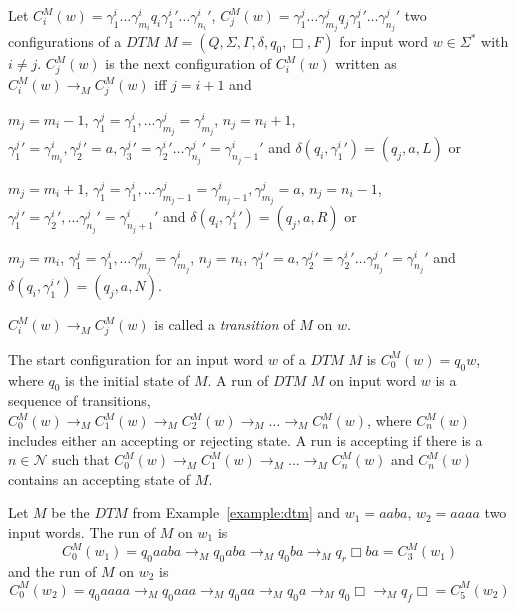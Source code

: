 \begin{definition}
    Let $C_i^M(w) = \gamma_1^i\dots\gamma_{m_i}^i{q_i}{\gamma_1^i}'\dots{\gamma_{n_i}^i}'$, $C_j^M(w) =
    \gamma_1^j\dots\gamma_{m_j}^j{q_j}{\gamma_1^j}'\dots{\gamma_{n_j}^j}'$ two configurations of a $\mathit{DTM}$ $M = (Q, \Sigma,
    \Gamma,
    \delta, q_0, \Box, F)$ for input word $w \in \Sigma^*$ with $i \neq j$. $C_j^M(w)$ is the next configuration
    of $C_i^M(w)$ written as $C_i^M(w) \rightarrow_M C_j^M(w)$ iff $j = i + 1$ and
    \begin{compactitem}
        \item $m_j = m_i - 1$, $\gamma_1^j = \gamma_1^i, \dots \gamma_{m_j}^j = \gamma_{m_j}^i$, $n_j = n_i + 1$,
        ${\gamma_1^j}' = \gamma_{m_i}^i, {\gamma_2^j}' = a, {\gamma_3^j}' = {\gamma_2^i}' \dots {\gamma_{n_j}^j}' =
        {\gamma_{{n_j}- 1}^i}'$ and $\delta(q_i, {\gamma_1^i}') = (q_j, a, L)$ or
        \item $m_j = m_i + 1$, $\gamma_1^j = \gamma_1^i, \dots \gamma_{m_j-1}^j = \gamma_{m_j-1}^i, \gamma_{m_j}^j
        = a$, $n_j = n_i - 1$, ${\gamma_1^j}' = {\gamma_2^i}', \dots {\gamma_{n_j}^j}' = {\gamma_{{n_j}+1}^i}'$ and
$\delta (q_i, {\gamma_1^i}') = (q_j, a, R)$ or
        \item $m_j = m_i$, $\gamma_1^j = \gamma_1^i, \dots \gamma_{m_j}^j = \gamma_{m_j}^i$, $n_j = n_i$, ${\gamma_1^j}'
= a, {\gamma_2^j}' = {\gamma_2^i}' \dots {\gamma_{n_j}^j}' = {\gamma_{n_j}^i}'$ and $\delta
        (q_i, {\gamma_1^i}') = (q_j, a, N)$.
    \end{compactitem}
    $C_i^M(w) \rightarrow_M C_j^M(w)$ is called a \emph{transition} of $M$ on $w$.
\end{definition}

The start configuration for an input word $w$ of a $\mathit{DTM}$ $M$ is $C_0^M(w) = q_0w$, where $q_0$ is the
initial state of $M$. A run of $\mathit{DTM}$ $M$ on input word $w$ is a sequence of transitions, $C_0^M(w)
\rightarrow_M C_1^M(w) \rightarrow_M C_2^M(w) \rightarrow_M \dots \rightarrow_M C_n^M(w)$, where $C_n^M(w)$ includes
either an accepting or rejecting state. A run is accepting if there is a $n \in \mathcal{N}$ such that $C_0^M(w)
\rightarrow_M C_1^M(w) \rightarrow_M \dots \rightarrow_M C_n^M(w)$ and $C_n^M(w)$ contains an accepting state of $M$.

\begin{example}
    \label{example:run_of_dtm}
    Let $M$ be the $\mathit{DTM}$ from Example~\ref{example:dtm} and $w_1 = aaba$, $w_2 = aaaa$ two input words. The
    run of $M$ on $w_1$ is
    \[C_0^M(w_1) = q_0aaba \rightarrow_M q_0aba \rightarrow_M q_0ba \rightarrow_M q_r\Box ba = C_3^M(w_1)\]
    and the run of $M$ on $w_2$ is
    \[C_0^M(w_2) = q_0aaaa \rightarrow_M q_0aaa \rightarrow_M q_0aa \rightarrow_M q_0a \rightarrow_M q_0\Box
    \rightarrow_M q_f\Box = C_5^M(w_2)\]
\end{example}

